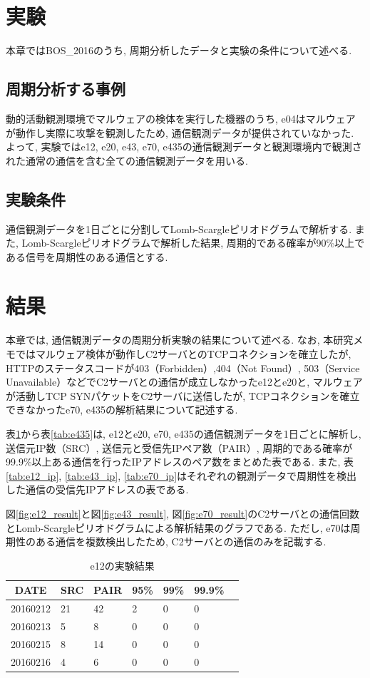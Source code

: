 \documentclass[twocolumn,10pt]{ltjsarticle}
\begin{document}
\section{実験}
本章ではBOS\_2016のうち, 周期分析したデータと実験の条件について述べる. 

\subsection{周期分析する事例}
動的活動観測環境でマルウェアの検体を実行した機器のうち, e04はマルウェアが動作し実際に攻撃を観測したため, 通信観測データが提供されていなかった. よって, 実験ではe12, e20, e43, e70, e435の通信観測データと観測環境内で観測された通常の通信を含む全ての通信観測データを用いる. 

\subsection{実験条件}
通信観測データを1日ごとに分割してLomb-Scargleピリオドグラムで解析する. また, Lomb-Scargleピリオドグラムで解析した結果, 周期的である確率が90\%以上である信号を周期性のある通信とする.

\section{結果}
本章では, 通信観測データの周期分析実験の結果について述べる. なお, 本研究メモではマルウェア検体が動作しC2サーバとのTCPコネクションを確立したが, HTTPのステータスコードが403（Forbidden）,404（Not Found）, 503（Service Unavailable）などでC2サーバとの通信が成立しなかったe12とe20と, マルウェアが活動しTCP SYNパケットをC2サーバに送信したが, TCPコネクションを確立できなかったe70, e435の解析結果について記述する. 

表\ref{tab:e12}から表\ref{tab:e435}は, e12とe20, e70, e435の通信観測データを1日ごとに解析し, 送信元IP数（SRC）, 送信元と受信先IPペア数（PAIR）, 周期的である確率が99.9\%以上ある通信を行ったIPアドレスのペア数をまとめた表である. また, 表\ref{tab:e12_ip}, \ref{tab:e43_ip}, \ref{tab:e70_ip}はそれぞれの観測データで周期性を検出した通信の受信先IPアドレスの表である. 

図\ref{fig:e12_result}と図\ref{fig:e43_result}, 図\ref{fig:e70_result}のC2サーバとの通信回数とLomb-Scargleピリオドグラムによる解析結果のグラフである. ただし, e70は周期性のある通信を複数検出したため, C2サーバとの通信のみを記載する. 

\begin{table}[htbp]
    \centering
    \caption{e12の実験結果}

    \begin{tabular}{c||llllll}
        \hline
        DATE & SRC & PAIR & 95\% & 99\% & 99.9\% \\
        \hline \hline
        20160212  & 21 & 42 & 2 & 0 & 0 \\
        20160213  & 5  & 8  & 0 & 0 & 0 \\
        20160215  & 8  & 14 & 0 & 0 & 0 \\
        20160216  & 4  & 6  & 0 & 0 & 0 \\
        \hline
    \end{tabular}
    \label{tab:e12}
\end{table}
\end{document}
